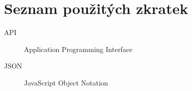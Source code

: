 \chapter{Seznam použitých zkratek}
\begin{description}
	\item[API] Application Programming Interface
	\item[JSON] JavaScript Object Notation
\end{description}
